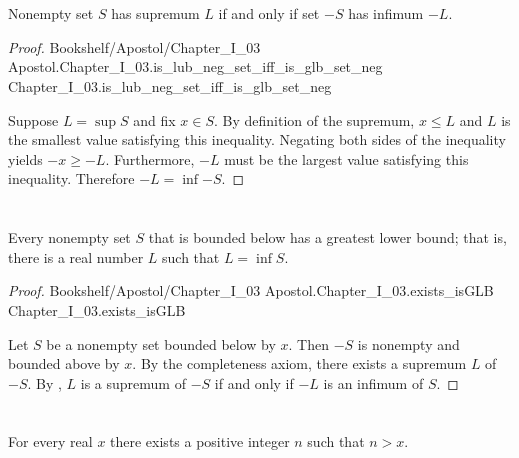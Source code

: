 \documentclass{article}
\newcommand{\link}[1]{\lean{../..}
  {Bookshelf/Apostol/Chapter\_I\_03} %
  {Apostol.Chapter\_I\_03.#1} %
  {Chapter\_I\_03.#1} %
}
\begin{document}

\section*{}%
%

Nonempty set $S$ has supremum $L$ if and only if set $-S$ has infimum $-L$.

\begin{proof}

  \link{is\_lub\_neg\_set\_iff\_is\_glb\_set\_neg}

  \divider

  Suppose $L = \sup{S}$ and fix $x \in S$.
  By definition of the supremum, $x \leq L$ and $L$ is the smallest value
    satisfying this inequality.
  Negating both sides of the inequality yields $-x \geq -L$.
  Furthermore, $-L$ must be the largest value satisfying this inequality.
  Therefore $-L = \inf{-S}$.

\end{proof}

\section*{}%
%

Every nonempty set $S$ that is bounded below has a greatest lower bound; that
  is, there is a real number $L$ such that $L = \inf{S}$.

\begin{proof}

  \link{exists\_isGLB}

  \divider

  Let $S$ be a nonempty set bounded below by $x$.
  Then $-S$ is nonempty and bounded above by $x$.
  By the completeness axiom, there exists a supremum $L$ of $-S$.
  By , $L$ is a supremum of $-S$ if and only if $-L$ is an
    infimum of $S$.

\end{proof}

\section*{}%

For every real $x$ there exists a positive integer $n$ such that $n > x$.
\end{document}
